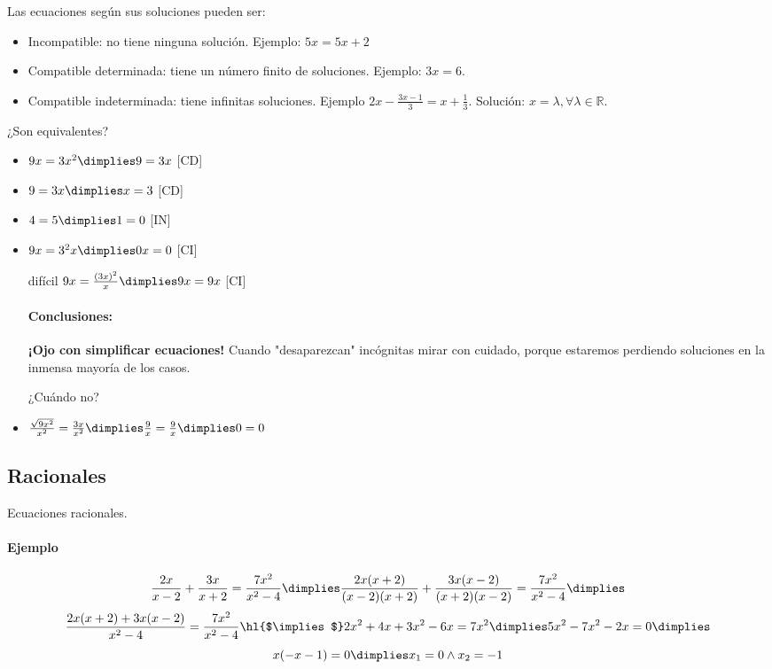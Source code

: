 Las ecuaciones según sus soluciones pueden ser:
\begin{itemize}
	\item Incompatible: no tiene ninguna solución. Ejemplo: $5x=5x+2$
	\item Compatible determinada: tiene un número finito de soluciones. Ejemplo: $3x=6$.
	\item Compatible indeterminada: tiene infinitas soluciones. Ejemplo $2x-\frac{3x-1}{3} = x+\frac{1}{3}$. Solución: $x=λ, ∀λ∈ℝ$.
\end{itemize}


\begin{example}
	¿Son equivalentes?
	\begin{itemize}
		\item $9x=3x^2 \dimplies 9=3x$ [CD]
		\item $9=3x \dimplies x=3$ [CD]
		\item $4=5 \dimplies 1=0$ [IN]
		\item $9x=3^2x \dimplies 0x=0$ [CI]
		\item[difícil] $9x=\frac{(3x)^2}{x} \dimplies 9x=9x$ [CI]

\paragraph{Conclusiones:} \textbf{¡Ojo con simplificar ecuaciones!} Cuando "desaparezcan" incógnitas mirar con cuidado, porque estaremos perdiendo soluciones en la inmensa mayoría de los casos.

¿Cuándo no?

	\item $\frac{\sqrt{9x^2}}{x^2}=\frac{3x}{x^2} \dimplies \frac{9}{x} = \frac{9}{x} \dimplies 0=0$
	\end{itemize}
\end{example}



\subsection{Racionales}

Ecuaciones racionales.

\paragraph{Ejemplo}
\[
	\frac{2x}{x-2} + \frac{3x}{x+2} = \frac{7x^2}{x^2-4} \dimplies \frac{2x(x+2)}{(x-2)(x+2)} + \frac{3x(x-2)}{(x+2)(x-2)} = \frac{7x^2}{x^2-4} \dimplies 
\]
\[
	\frac{2x(x+2)+3x(x-2)}{x^2-4} = \frac{7x^2}{x^2-4} \text{\hl{$\implies$}} 2x^2+4x+3x^2-6x=7x^2 \dimplies 5x^2-7x^2-2x = 0 \dimplies 
\]
\[
	x(-x-1) = 0 \dimplies x_1 = 0 \wedge x_2 = -1
\]

